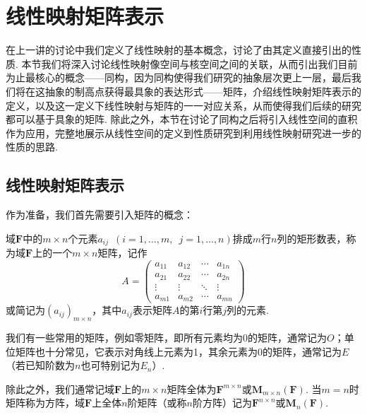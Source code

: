 \chapter{线性映射矩阵表示}

在上一讲的讨论中我们定义了线性映射的基本概念，讨论了由其定义直接引出的性质. 本节我们将深入讨论线性映射像空间与核空间之间的关联，从而引出我们目前为止最核心的概念——同构，因为同构使得我们研究的抽象层次更上一层，最后我们将在这抽象的制高点获得最具象的表达形式——矩阵，介绍线性映射矩阵表示的定义，以及这一定义下线性映射与矩阵的一一对应关系，从而使得我们后续的研究都可以基于具象的矩阵. 除此之外，本节在讨论了同构之后将引入线性空间的直积作为应用，完整地展示从线性空间的定义到性质研究到利用线性映射研究进一步的性质的思路.

\section{线性映射矩阵表示}

作为准备，我们首先需要引入矩阵的概念：
\begin{definition}
    域$\mathbf{F}$中的$m\times n$个元素$a_{ij}\enspace(i=1,\ldots,m,\enspace j=1,\ldots,n)$排成$m$行$n$列的矩形数表，称为域$\mathbf{F}$上的一个$m\times n$矩阵，记作
    \[A=\begin{pmatrix}
            a_{11} & a_{12} & \cdots & a_{1n} \\
            a_{21} & a_{22} & \cdots & a_{2n} \\
            \vdots & \vdots & \ddots & \vdots \\
            a_{m1} & a_{m2} & \cdots & a_{mn}
        \end{pmatrix}\]
    或简记为$(a_{ij})_{m\times n}$，其中$a_{ij}$表示矩阵$A$的第$i$行第$j$列的元素.
\end{definition}

我们有一些常用的矩阵，例如零矩阵，即所有元素均为0的矩阵，通常记为$O$；单位矩阵也十分常见，它表示对角线上元素为1，其余元素为0的矩阵，通常记为$E$（若已知阶数为$n$也可特别记为$E_n$）.

除此之外，我们通常记域$\mathbf{F}$上的$m\times n$矩阵全体为$\mathbf{F}^{m\times n}$或$\mathbf{M}_{m\times n}(\mathbf{F})$. 当$m=n$时矩阵称为方阵，域$\mathbf{F}$上全体$n$阶矩阵（或称$n$阶方阵）记为$\mathbf{F}^{n\times n}$或$\mathbf{M}_n(\mathbf{F})$.

